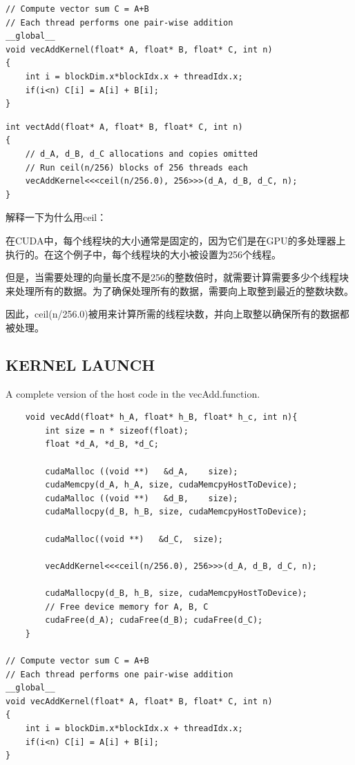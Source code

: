 \documentclass[11pt]{ctexart}
\begin{document}
\begin{lstlisting}
// Compute vector sum C = A+B
// Each thread performs one pair-wise addition
__global__
void vecAddKernel(float* A, float* B, float* C, int n)
{
	int i = blockDim.x*blockIdx.x + threadIdx.x;
	if(i<n) C[i] = A[i] + B[i];
}
\end{lstlisting}




\begin{lstlisting}
int vectAdd(float* A, float* B, float* C, int n)
{
	// d_A, d_B, d_C allocations and copies omitted
	// Run ceil(n/256) blocks of 256 threads each
	vecAddKernel<<<ceil(n/256.0), 256>>>(d_A, d_B, d_C, n);
}
\end{lstlisting}

解释一下为什么用ceil：

在CUDA中，每个线程块的大小通常是固定的，因为它们是在GPU的多处理器上执行的。在这个例子中，每个线程块的大小被设置为256个线程。

但是，当需要处理的向量长度不是256的整数倍时，就需要计算需要多少个线程块来处理所有的数据。为了确保处理所有的数据，需要向上取整到最近的整数块数。

因此，ceil(n/256.0)被用来计算所需的线程块数，并向上取整以确保所有的数据都被处理。

\subsection{KERNEL LAUNCH}

A complete version of the host code in the vecAdd.function.

\begin{lstlisting}
	void vecAdd(float* h_A, float* h_B, float* h_c, int n){
		int size = n * sizeof(float);
		float *d_A, *d_B, *d_C;
		
		cudaMalloc ((void **)   &d_A,    size);
		cudaMemcpy(d_A, h_A, size, cudaMemcpyHostToDevice);
		cudaMalloc ((void **)   &d_B,    size);
		cudaMallocpy(d_B, h_B, size, cudaMemcpyHostToDevice);
		
		cudaMalloc((void **)   &d_C,  size);
		
		vecAddKernel<<<ceil(n/256.0), 256>>>(d_A, d_B, d_C, n);
		
		cudaMallocpy(d_B, h_B, size, cudaMemcpyHostToDevice);
		// Free device memory for A, B, C
		cudaFree(d_A); cudaFree(d_B); cudaFree(d_C);
	} 

// Compute vector sum C = A+B
// Each thread performs one pair-wise addition
__global__
void vecAddKernel(float* A, float* B, float* C, int n)
{
	int i = blockDim.x*blockIdx.x + threadIdx.x;
	if(i<n) C[i] = A[i] + B[i];
}

\end{lstlisting}
\end{document}
